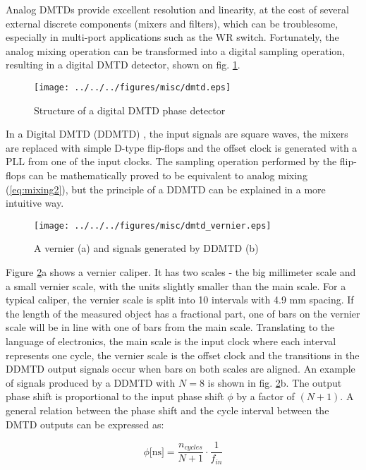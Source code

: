 Analog DMTDs provide excellent resolution and linearity, at the cost of several
external discrete components (mixers and filters), which can be troublesome,
especially in multi-port applications such as the WR switch. Fortunately, the
analog mixing operation can be transformed into a digital sampling operation,
resulting in a digital DMTD detector, shown on fig. \ref{fig:digital_dmtd}.
\begin{figure}[ht!]
  \centering
  \texttt{[image: ../../../figures/misc/dmtd.eps]}
  \caption{Structure of a digital DMTD phase detector}
  \label{fig:digital_dmtd}
\end{figure}
In a Digital DMTD (DDMTD) \cite{icalepcs09}, the input signals are square
waves, the mixers are replaced with simple D-type flip-flops and the offset
clock is generated with a PLL from one of the input clocks. The sampling
operation performed by the flip-flops can be mathematically proved to be
equivalent to analog mixing (\ref{eq:mixing2}), but the principle of a DDMTD
can be explained in a more intuitive way.
\begin{figure}[ht!]
  \centering
  \texttt{[image: ../../../figures/misc/dmtd\_vernier.eps]}
  \caption{A vernier (a) and signals generated by DDMTD (b)}
  \label{fig:dmtd_vernier}
\end{figure}
Figure \ref{fig:dmtd_vernier}a shows a vernier caliper. It has two scales -
the big millimeter scale and a small vernier scale, with the units slightly
smaller than the main scale. For a typical caliper, the vernier scale is split
into 10 intervals with 4.9 mm spacing. If the length of the measured object
has a fractional part, one of bars on the vernier scale will be in line with
one of bars from the main scale. Translating to the language of electronics,
the main scale is the input clock where each interval represents one cycle,
the vernier scale is the offset clock and the transitions in the DDMTD output
signals occur when bars on both scales are aligned. An example of signals
produced by a DDMTD with $N = 8$ is shown in fig. \ref{fig:dmtd_vernier}b. The
output phase shift is proportional to the input phase shift $\phi$ by a
factor of $(N+1)$. A general relation between the phase shift and the cycle
interval between the DMTD outputs can be expressed as:

\begin{equation}
\label{eq:dmtd1}
\phi \mbox{[ns]} = \frac{n_{cycles}}{N+1} \cdot \frac{1}{f_{in}}
\end{equation}


